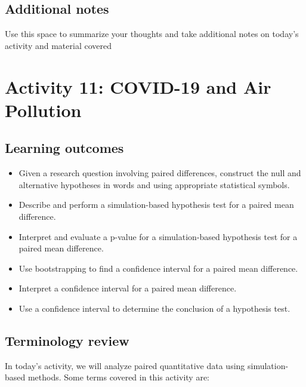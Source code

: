 \documentclass[
]{report}
\begin{document}
\hypertarget{additional-notes-3}{%
\subsection{Additional notes}\label{additional-notes-3}}

Use this space to summarize your thoughts and take additional notes on today's activity and material covered

\newpage

\hypertarget{activity-11-covid-19-and-air-pollution}{%
\section{Activity 11: COVID-19 and Air Pollution}\label{activity-11-covid-19-and-air-pollution}}


\hypertarget{learning-outcomes-4}{%
\subsection{Learning outcomes}\label{learning-outcomes-4}}

\begin{itemize}
\item
  Given a research question involving paired differences, construct the null and alternative hypotheses
  in words and using appropriate statistical symbols.
\item
  Describe and perform a simulation-based hypothesis test for a paired mean difference.
\item
  Interpret and evaluate a p-value for a simulation-based hypothesis test for a paired mean difference.
\item
  Use bootstrapping to find a confidence interval for a paired mean difference.
\item
  Interpret a confidence interval for a paired mean difference.
\item
  Use a confidence interval to determine the conclusion of a hypothesis test.
\end{itemize}

\hypertarget{terminology-review-3}{%
\subsection{Terminology review}\label{terminology-review-3}}

In today's activity, we will analyze paired quantitative data using simulation-based methods. Some terms covered in this activity are:
\end{document}
